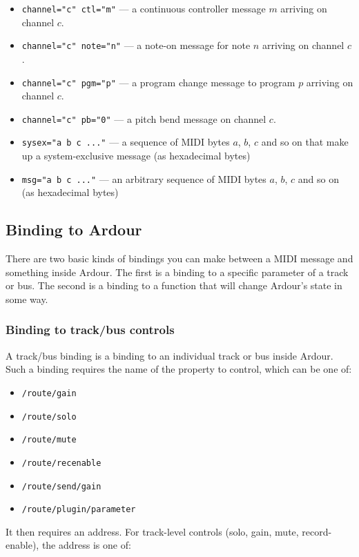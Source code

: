 \documentclass[10pt,a4paper]{book}
\begin{document}
\begin{itemize}
\item \texttt{channel="c" ctl="m"} --- a continuous controller message $m$ arriving on channel $c$.
\item \texttt{channel="c" note="n"} --- a note-on message for note $n$ arriving on channel $c$.
\item \texttt{channel="c" pgm="p"} --- a program change message to program $p$ arriving on channel $c$.
\item \texttt{channel="c" pb="0"} --- a pitch bend message on channel $c$.
\item \texttt{sysex="a b c ..."} --- a sequence of MIDI bytes $a$, $b$, $c$ and so on that make up a system-exclusive message (as hexadecimal bytes)
\item \texttt{msg="a b c ..."} --- an arbitrary sequence of MIDI bytes $a$, $b$, $c$ and so on (as hexadecimal bytes)
\end{itemize}

\subsection{Binding to Ardour}

There are two basic kinds of bindings you can make between a MIDI
message and something inside Ardour. The first is a binding to a
specific parameter of a track or bus. The second is a binding to a
function that will change Ardour's state in some way. 


\subsubsection{Binding to track/bus controls}

A track/bus binding is a binding to an individual track or bus inside
Ardour.  Such a binding requires the name of the property to control,
which can be one of:

\begin{itemize}
\item \texttt{/route/gain}
\item \texttt{/route/solo}
\item \texttt{/route/mute}
\item \texttt{/route/recenable}
\item \texttt{/route/send/gain}
\item \texttt{/route/plugin/parameter}
\end{itemize}

It then requires an address.  For track-level controls (solo, gain, mute, record-enable), the address is one of:
\end{document}
